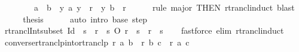 \begin{isabellebody}
\ \ %
\isanewline
%
\isadelimproof
%
\endisadelimproof
%
\isatagproof
{}\isamarkupfalse%
\ {\isacharminus}{\kern0pt}\isanewline
\ \ \isamarkupfalse%
\ {\isachardoublequoteopen}a\ {\isacharequal}{\kern0pt}\ b\ {\isasymor}\ {\isacharparenleft}{\kern0pt}{\isasymexists}y{\isachardot}{\kern0pt}\ {\isacharparenleft}{\kern0pt}a{\isacharcomma}{\kern0pt}\ y{\isacharparenright}{\kern0pt}\ {\isasymin}\ r\isactrlsup {\isacharasterisk}{\kern0pt}\ {\isasymand}\ {\isacharparenleft}{\kern0pt}y{\isacharcomma}{\kern0pt}\ b{\isacharparenright}{\kern0pt}\ {\isasymin}\ r{\isacharparenright}{\kern0pt}{\isachardoublequoteclose}\isanewline
\ \ \ \ \isamarkupfalse%
\ {\isacharparenleft}{\kern0pt}rule\ major\ {\isacharbrackleft}{\kern0pt}THEN\ rtrancl{\isacharunderscore}{\kern0pt}induct{\isacharbrackright}{\kern0pt}{\isacharparenright}{\kern0pt}\ blast{\isacharplus}{\kern0pt}\isanewline
\ \ \isamarkupfalse%
\ \isamarkupfalse%
\ {\isacharquery}{\kern0pt}thesis\isanewline
\ \ \ \ \isamarkupfalse%
\ {\isacharparenleft}{\kern0pt}auto\ intro{\isacharcolon}{\kern0pt}\ base\ step{\isacharparenright}{\kern0pt}\isanewline
{}\isamarkupfalse%
%
\endisatagproof
{\isafoldproof}%
%
\isadelimproof
\isanewline
%
\endisadelimproof
\isanewline
{}\isamarkupfalse%
\ rtrancl{\isacharunderscore}{\kern0pt}Int{\isacharunderscore}{\kern0pt}subset{\isacharcolon}{\kern0pt}\ {\isachardoublequoteopen}Id\ {\isasymsubseteq}\ s\ {\isasymLongrightarrow}\ {\isacharparenleft}{\kern0pt}r\isactrlsup {\isacharasterisk}{\kern0pt}\ {\isasyminter}\ s{\isacharparenright}{\kern0pt}\ O\ r\ {\isasymsubseteq}\ s\ {\isasymLongrightarrow}\ r\isactrlsup {\isacharasterisk}{\kern0pt}\ {\isasymsubseteq}\ s{\isachardoublequoteclose}\isanewline
%
\isadelimproof
\ \ %
\endisadelimproof
%
\isatagproof
{}\isamarkupfalse%
\ {\isacharparenleft}{\kern0pt}fastforce\ elim{\isacharcolon}{\kern0pt}\ rtrancl{\isacharunderscore}{\kern0pt}induct{\isacharparenright}{\kern0pt}%
\endisatagproof
{\isafoldproof}%
%
\isadelimproof
\isanewline
%
\endisadelimproof
\isanewline
{}\isamarkupfalse%
\ converse{\isacharunderscore}{\kern0pt}rtranclp{\isacharunderscore}{\kern0pt}into{\isacharunderscore}{\kern0pt}rtranclp{\isacharcolon}{\kern0pt}\ {\isachardoublequoteopen}r\ a\ b\ {\isasymLongrightarrow}\ r\isactrlsup {\isacharasterisk}{\kern0pt}\isactrlsup {\isacharasterisk}{\kern0pt}\ b\ c\ {\isasymLongrightarrow}\ r\isactrlsup {\isacharasterisk}{\kern0pt}\isactrlsup {\isacharasterisk}{\kern0pt}\ a\ c{\isachardoublequoteclose}\isanewline

\end{isabellebody}
